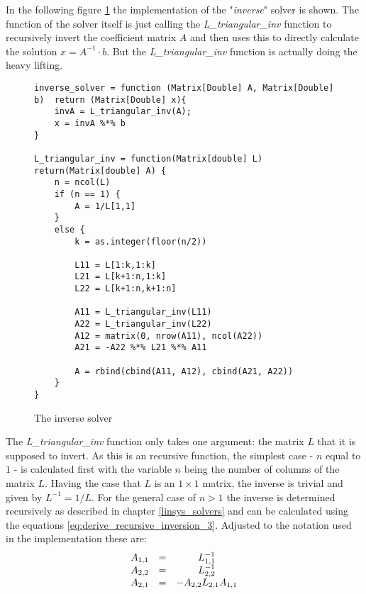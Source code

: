 In the following figure \ref{fig:inverse} the implementation of the "\textit{inverse}" solver is shown. The function of the solver itself is just calling the \textit{L\_triangular\_inv} function to recursively invert the coefficient matrix $A$ and then uses this to directly calculate the solution $x=A^{-1} \cdot b$. But the \textit{L\_triangular\_inv} function is actually doing the heavy lifting.


\begin{figure}[!ht]
\centering
\begin{verbatim}
inverse_solver = function (Matrix[Double] A, Matrix[Double] b)  return (Matrix[Double] x){
    invA = L_triangular_inv(A);
    x = invA %*% b
}

L_triangular_inv = function(Matrix[double] L) return(Matrix[double] A) {
    n = ncol(L)
    if (n == 1) {
        A = 1/L[1,1]
    }
    else {
        k = as.integer(floor(n/2))
        
        L11 = L[1:k,1:k]
        L21 = L[k+1:n,1:k]
        L22 = L[k+1:n,k+1:n]
        
        A11 = L_triangular_inv(L11)
        A22 = L_triangular_inv(L22)
        A12 = matrix(0, nrow(A11), ncol(A22))
        A21 = -A22 %*% L21 %*% A11
        
        A = rbind(cbind(A11, A12), cbind(A21, A22))
    }
}
\end{verbatim}
\vspace*{-0.3cm}
\caption{The inverse solver}
\label{fig:inverse}
\end{figure}

The \textit{L\_triangular\_inv} function only takes one argument: the matrix $L$ that it is supposed to invert. As this is an recursive function, the simplest case - $n$ equal to $1$ -  is calculated first with the variable $n$ being the number of columns of the matrix $L$. Having the case that $L$ is an $1 \times 1$ matrix, the inverse is trivial and given by $L^{-1} = 1/L$. For the general case of $n > 1$ the inverse is determined recursively as described in chapter \ref{linsys_solvers} and can be calculated using the equations \ref{eq:derive_recursive_inversion_3}. Adjusted to the notation used in the implementation these are:
\begin{equation*}
    \begin{array}[c]{ccc}
        A_{1,1} &=& L_{1,1}^{-1}\\
        A_{2,2} &=& L_{2,2}^{-1} \\
        A_{2,1} &=& - A_{2,2} L_{2,1} A_{1,1}
    \end{array}
\end{equation*}

